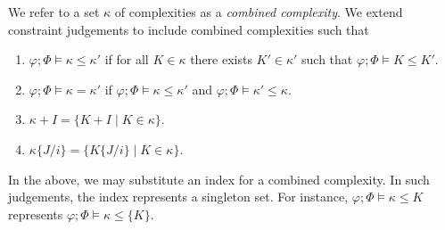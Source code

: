 \begin{defi}\label{def:combinedcomp} 
    We refer to a set $\kappa$ of complexities as a \textit{combined complexity}. We extend constraint judgements to include combined complexities such that
    \begin{enumerate}
        \item $\varphi;\Phi\vDash \kappa \leq \kappa'$ if for all $K \in \kappa$ there exists $K'\in \kappa'$ such that $\varphi;\Phi\vDash K \leq K'$.
        \item $\varphi;\Phi\vDash \kappa = \kappa'$ if $\varphi;\Phi\vDash \kappa \leq \kappa'$ and $\varphi;\Phi\vDash \kappa' \leq \kappa$.
        \item $\kappa + I = \{K + I \mid K \in \kappa\}$.
        \item $\kappa\{J/i\} = \{ K\{J/i\} \mid K\in\kappa \}$.
    \end{enumerate}
    In the above, we may substitute an index for a combined complexity. In such judgements, the index represents a singleton set. For instance, $\varphi;\Phi\vDash \kappa \leq K$ represents $\varphi;\Phi\vDash \kappa \leq \{K\}$.
\end{defi}

